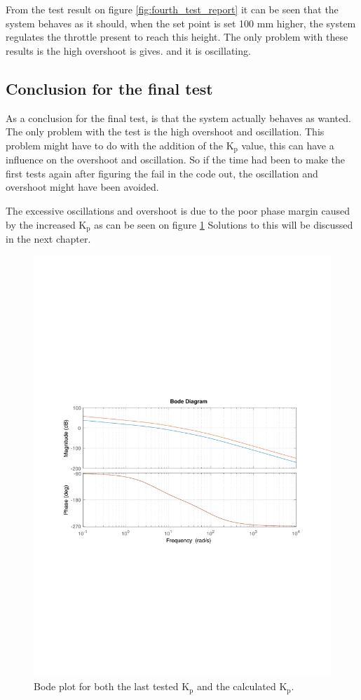 From the test result on figure \ref{fig:fourth_test_report} it can be seen that the system behaves as it should, when the set point is set 100 mm higher, the system regulates the throttle present to reach this height. The only problem with these results is the high overshoot is gives. and it is oscillating.

\subsection*{Conclusion for the final test}
As a conclusion for the final test, is that the system actually behaves as wanted. The only problem with the test is the high overshoot and oscillation. This problem might have to do with the addition of the K$_\text{p}$ value, this can have a influence on the overshoot and oscillation. So if the time had been to make the first tests again after figuring the fail in the code out, the oscillation and overshoot might have been avoided.

 The excessive oscillations and overshoot is due to the poor phase margin caused by the increased K$_\text{p}$ as can be seen on figure \ref{fig:bodeplot_final} Solutions to this will be discussed in the next chapter.

\begin{figure}[H]
    \centering
    \includegraphics[width=\textwidth]{figures/Appendix/final_test/bodeplot_final.pdf}
    \caption{Bode plot for both the last tested K$_\text{p}$ and the calculated K$_\text{p}$.}
    \label{fig:bodeplot_final}
\end{figure}